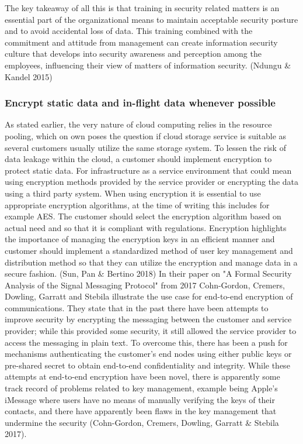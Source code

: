 \documentclass{article}
\begin{document}
\par
The key takeaway of all this is that training in security related matters is an essential part of the organizational means to maintain acceptable security posture and to avoid accidental loss of data. This training combined with the commitment and attitude from management can create information security culture that develops into security awareness and perception among the employees, influencing their view of matters of information security. (Ndungu \& Kandel 2015) 
\subsubsection{Encrypt static data and in-flight data whenever possible}
As stated earlier, the very nature of cloud computing relies in the resource pooling, which on own poses the question if cloud storage service is suitable as several customers usually utilize the same storage system. To lessen the risk of data leakage within the cloud, a customer should implement encryption to protect static data. For infrastructure as a service environment that could mean using encryption methods provided by the service provider or encrypting the data using a third party system. When using encryption it is essential to use appropriate encryption algorithms, at the time of writing this includes for example AES. The customer should select the encryption algorithm based on actual need and so that it is compliant with regulations. Encryption highlights the importance of managing the encryption keys in an efficient manner and customer should implement a standardized method of user key management and distribution method so that they can utilize the encryption and manage data in a secure fashion. (Sun, Pan \& Bertino 2018)
In their paper on "A Formal Security Analysis of the Signal Messaging Protocol" from 2017 Cohn-Gordon, Cremers, Dowling, Garratt and Stebila illustrate the use case for end-to-end encryption of communications.
They state that in the past there have been attempts to improve security by encrypting the messaging between the customer and service provider; while this provided some security, it still allowed the service provider to access the messaging in plain text.
To overcome this, there has been a push for mechanisms authenticating the customer's end nodes using either public keys or pre-shared secret to obtain end-to-end confidentiality and integrity.
While these attempts at end-to-end encryption have been novel, there is apparently some track record of problems related to key management, example being Apple's iMessage where users have no means of manually verifying the keys of their contacts, and  there have apparently been flaws in the key management that undermine the security (Cohn-Gordon, Cremers, Dowling, Garratt \& Stebila 2017).
\end{document}
